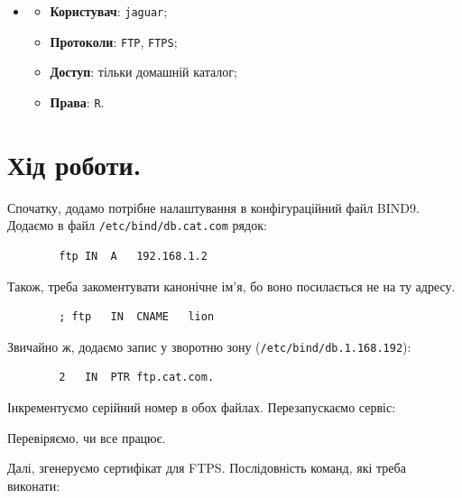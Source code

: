 \documentclass[14pt, a4paper]{extreport}
\begin{document}
\begin{itemize}
\begin{itemize}
			\item \textbf{Права}: \texttt{RW}.
		\end{itemize}
		
		\item \begin{itemize}
			\item \textbf{Користувач}: \texttt{jaguar};
			
			\item \textbf{Протоколи}: \texttt{FTP}, \texttt{FTPS};
			
			\item \textbf{Доступ}: тільки домашній каталог;
			
			\item \textbf{Права}: \texttt{R}.
		\end{itemize}
	\end{itemize}
	
	\section*{Хід роботи.}
	
	Спочатку, додамо потрібне налаштування в конфігураційний файл BIND9. Додаємо в файл \texttt{/etc/bind/db.cat.com} рядок: \sideat{[VM 1]}
	
	\begin{verbatim}
		ftp	IN	A	192.168.1.2
	\end{verbatim}
	
	Також, треба закоментувати канонічне ім'я, бо воно посилається не на ту адресу.
	
	\begin{verbatim}
		; ftp	IN	CNAME	lion
	\end{verbatim}
	
	Звичайно ж, додаємо запис у зворотню зону (\texttt{/etc/bind/db.1.168.192}):
	
	\begin{verbatim}
		2	IN	PTR	ftp.cat.com.
	\end{verbatim}
	
	Інкрементуємо серійний номер в обох файлах. Перезапускаємо сервіс:
	
	
	Перевіряємо, чи все працює. \sideat{[VM 2]}
	
	
	Далі, згенеруємо сертифікат для FTPS. Послідовність команд, які треба виконати: \sideat{[VM 1]}
	
\end{document}

